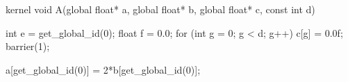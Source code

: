 kernel void A(global float* a,
              global float* b,
              global float* c,
              const int d) {
  int e = get_global_id(0);
  float f = 0.0;
  for (int g = 0; g < d; g++) {
    c[g] = 0.0f;
  }
  barrier(1);

  a[get_global_id(0)] = 2*b[get_global_id(0)];
}
